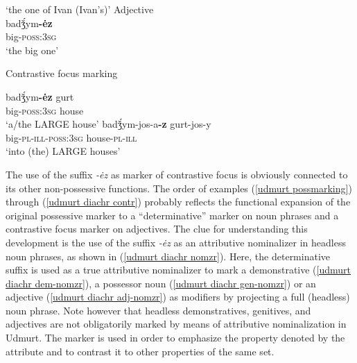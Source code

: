 \begin{exe}
\begin{xlist}
\begin{xlist}
\glt	 ‘the one of Ivan (Ivan's)’
\ex 	\rm{Adjective}\\ \label{udmurt diachr adj-nomzr}
\gll	badǯ́ym\textbf{-ėz}\\
	big-\textsc{poss:3sg}\\
\glt	 ‘the big one’
\end{xlist}
\ex \rm{Contrastive focus marking} \label{udmurt diachr contr}
\begin{xlist}
\ex	
\gll	badǯ́ym\textbf{-ėz} gurt\\
	big-\textsc{poss:3sg} house\\
\glt	‘a/the LARGE house’
\ex	
\gll	badǯ́ym-jos-a\textbf{-z} gurt-jos-y\\
	big-\textsc{pl}-\textsc{ill}-\textsc{poss:3sg} house-\textsc{pl}-\textsc{ill}\\
\glt	‘into (the) LARGE houses’
\end{xlist}
\end{xlist}
\end{exe}
The use of the suffix \textit{-ėz} as marker of contrastive focus is obviously connected to its other non-possessive functions. The order of examples (\ref{udmurt possmarking}) through (\ref{udmurt diachr contr}) probably reflects the functional expansion of the original possessive marker to a “determinative” marker on noun phrases and a contrastive focus marker on adjectives. The clue for understanding this development is the use of the suffix \textit{-ėz} as an attributive nominalizer in headless noun phrases, as shown in (\ref{udmurt diachr nomzr}). Here, the determinative suffix is used as a true attributive nominalizer to mark a demonstrative (\ref{udmurt diachr dem-nomzr}), a possessor noun (\ref{udmurt diachr gen-nomzr}) or an adjective (\ref{udmurt diachr adj-nomzr}) as modifiers by projecting a full (headless) noun phrase. Note however that headless demonstratives, genitives, and adjectives are not obligatorily marked by means of attributive nominalization in Udmurt. The marker is used in order to emphasize the property denoted by the attribute and to contrast it to other properties of the same set.

